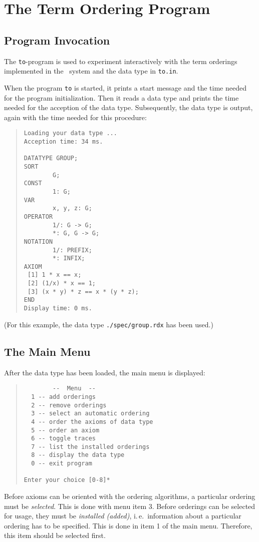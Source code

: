\section{The Term Ordering Program}
\subsection{Program Invocation}
The {\tt to}-program is used to experiment interactively with the 
term orderings implemented in the \redux\ system and the data type
in {\tt to.in}.

When the program {\tt to} is started, it prints a start message and 
the time needed for the program initialization.
Then it reads a data type and prints the time needed
for the acception of the data type. Subsequently, the data type is output,
again with the time needed for this procedure:
\begin{quote}
\begin{verbatim}
Loading your data type ...
Acception time: 34 ms.
 
DATATYPE GROUP;
SORT
        G;
CONST
        1: G;
VAR
        x, y, z: G;
OPERATOR
        1/: G -> G;
        *: G, G -> G;
NOTATION
        1/: PREFIX;
        *: INFIX;
AXIOM
 [1] 1 * x == x;
 [2] (1/x) * x == 1;
 [3] (x * y) * z == x * (y * z);
END
Display time: 0 ms.
\end{verbatim}
\end{quote}
 
(For this example, the data type {\tt ./spec/group.rdx} has been used.)


\subsection{The Main Menu}
After the data type has been loaded, the main menu is displayed:
\begin{quote}
\begin{verbatim}
        --  Menu  -- 
  1 -- add orderings
  2 -- remove orderings
  3 -- select an automatic ordering
  4 -- order the axioms of data type
  5 -- order an axiom
  6 -- toggle traces
  7 -- list the installed orderings
  8 -- display the data type
  0 -- exit program
 
Enter your choice [0-8]*
\end{verbatim}
\end{quote}

Before axioms can be oriented with the ordering algorithms, a 
particular ordering must be {\em selected}. This is done with menu
item 3.
Before orderings can be selected for usage, they must be {\em installed
(added)}, i.\,e.\  
information about a particular ordering has to be specified. This is
done in item 1 of the main menu. Therefore, this item should be selected
first.

